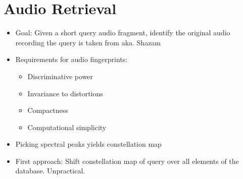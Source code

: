 \section{Audio Retrieval}
\begin{itemize}
	\item
		Goal: Given a short query audio fragment, identify the original audio recording the query is taken from aka. Shazam
	\item
		Requirements for audio fingerprints:
		\begin{itemize}
			\item
				Discriminative power
			\item
				Invariance to distortions
			\item
				Compactness
			\item
				Computational simplicity
		\end{itemize}
	\item
		Picking spectral peaks yields constellation map
	\item
		First approach: Shift constellation map of query over all elements of the database. Unpractical.

\end{itemize}
